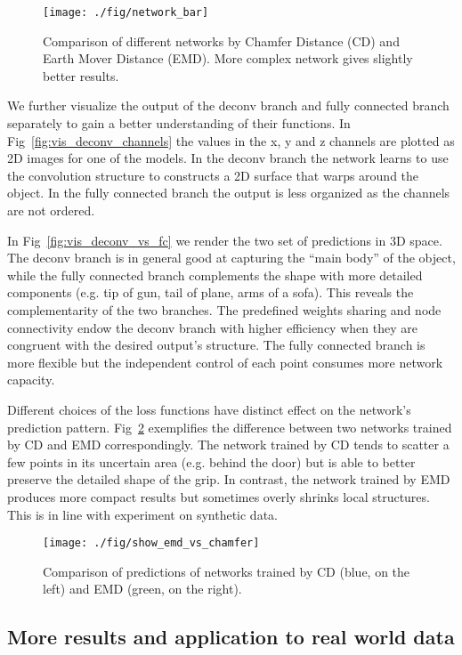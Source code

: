 \documentclass[10pt,twocolumn,letterpaper]{article}
\begin{document}
\begin{figure}[t!]
  \centering
  \texttt{[image: ./fig/network\_bar]}
  \caption{Comparison of different networks by Chamfer Distance (CD) and Earth Mover Distance (EMD). More complex network gives slightly better results. }\label{fig:compare_networks}
  \vspace{-1em}
\end{figure}

We further visualize the output of the deconv branch and fully connected branch separately to gain a better understanding of their functions. In Fig~\ref{fig:vis_deconv_channels} the values in the x, y and z channels are plotted as 2D images for one of the models. In the deconv branch the network learns to use the convolution structure to constructs a 2D surface that warps around the object. In the fully connected branch the output is less organized as the channels are not ordered.


In Fig~\ref{fig:vis_deconv_vs_fc} we render the two set of predictions in 3D space. The deconv branch is in general good at capturing the ``main body'' of the object, while the fully connected branch complements the shape with more detailed components (e.g. tip of gun, tail of plane, arms of a sofa). This reveals the complementarity of the two branches. The predefined weights sharing and node connectivity endow the deconv branch with higher efficiency when they are congruent with the desired output's structure. The fully connected branch is more flexible but the independent control of each point consumes more network capacity.


Different choices of the loss functions have distinct effect on the network's prediction pattern. Fig~\ref{fig:emd_vs_chamfer} exemplifies the difference between two networks trained by CD and EMD correspondingly. The network trained by CD tends to scatter a few points in its uncertain area (e.g. behind the door) but is able to better preserve the detailed shape of the grip. In contrast, the network trained by EMD produces more compact results but sometimes overly shrinks local structures. This is in line with experiment on synthetic data.

\begin{figure}[ht!]
  \centering
  \texttt{[image: ./fig/show\_emd\_vs\_chamfer]}
  \caption{Comparison of predictions of networks trained by CD (blue, on the left) and EMD (green, on the right). }\label{fig:emd_vs_chamfer}
  \vspace{-1em}
\end{figure}\subsection{More results and application to real world data}\label{sec:exp:more}
 
\end{document}
